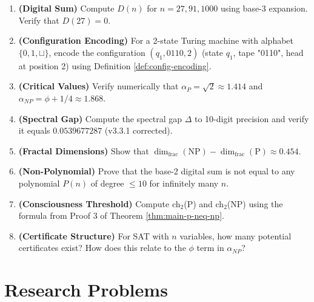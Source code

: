 \begin{enumerate}
\item \textbf{(Digital Sum)} Compute $D(n)$ for $n = 27, 91, 1000$ using base-3 expansion. Verify that $D(27) = 0$.

\item \textbf{(Configuration Encoding)} For a 2-state Turing machine with alphabet $\{0,1,\sqcup\}$, encode the configuration $(q_1, 0110, 2)$ (state $q_1$, tape "0110", head at position 2) using Definition \ref{def:config-encoding}.

\item \textbf{(Critical Values)} Verify numerically that $\alpha_P = \sqrt{2} \approx 1.414$ and $\alpha_{NP} = \phi + 1/4 \approx 1.868$.

\item \textbf{(Spectral Gap)} Compute the spectral gap $\Delta$ to 10-digit precision and verify it equals $0.0539677287$ (v3.3.1 corrected).

\item \textbf{(Fractal Dimensions)} Show that $\dim_{\text{frac}}(\text{NP}) - \dim_{\text{frac}}(\text{P}) \approx 0.454$.

\item \textbf{(Non-Polynomial)} Prove that the base-2 digital sum is not equal to any polynomial $P(n)$ of degree $\leq 10$ for infinitely many $n$.

\item \textbf{(Consciousness Threshold)} Compute ch$_2$(P) and ch$_2$(NP) using the formula from Proof 3 of Theorem \ref{thm:main-p-neq-np}.

\item \textbf{(Certificate Structure)} For SAT with $n$ variables, how many potential certificates exist? How does this relate to the $\phi$ term in $\alpha_{NP}$?

\end{enumerate}

\section*{Research Problems}


